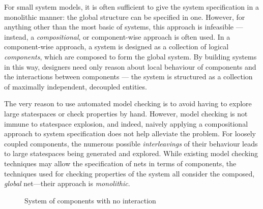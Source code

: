 For small system models, it is often sufficient to give the system
specification in a monolithic manner: the global structure can be
specified in one. However, for anything other than the most basic of systems,
this approach is infeasible --- instead, a \emph{compositional}, or
component-wise approach is often used. In a component-wise approach, a
system is designed as a collection of logical \emph{components}, which are
composed to form the global system. By building systems in this way,
designers need only reason about local behaviour of components and the
interactions between components --- the system is structured as a
collection of maximally independent, decoupled entities.

The very reason to use automated model checking is to avoid having to explore
large statespaces or check properties by hand. However, model checking is not
immune to statespace explosion, and indeed, naively applying a compositional
approach to system specification does not help alleviate the problem. For
loosely coupled components, the numerous possible \emph{interleavings} of their
behaviour leads to large statespaces being generated and explored.  While
existing model checking techniques may allow the specification of nets in terms
of components, the techniques used for checking properties of the system all
consider the composed, \emph{global} net---their approach is \emph{monolithic}.

\newcommand{\drawComp}[2]{%
    \pgfmathtruncatemacro{\prev}{#1 - 1}
    \node (p#1-2) [anchor=north, right=of p\prev-2] {\rotatebox{90}{$\cdots$}};
    \node[pnbplace] (p#1-1) [rotate=-90, above=of p#1-2, pnblabel=$\aPlace_{1,#2}$] {};
    \node[pnbplace] (p#1-0) [rotate=-90, above=of p#1-1, tokens=1, pnblabel=$\aPlace_{0,#2}$] {};
    \node[draw=blue, pnbplace, pnblabel=$\aPlace_{\bN,#2}$] (p#1-3) [rotate=-90, below=of p#1-2] {};

    \labelledpnbarr{p#1-0.out}{p#1-1.in}{}{relative}{}
    \labelledpnbarr{p#1-1.out}{p#1-2}{}{relative}{}
    \labelledpnbarr{p#1-2}{p#1-3.in}{}{relative}{}
}%
\begin{figure}[ht]
\centering
{}
\caption{System of components with no interaction}
\label{fig:componentSystem}
\end{figure}


